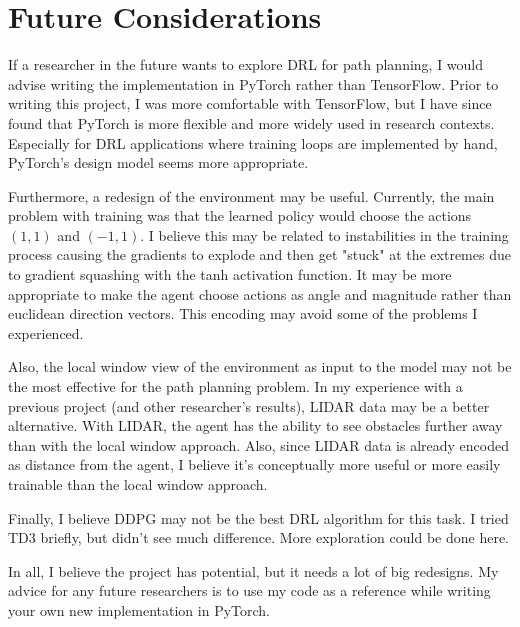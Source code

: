 \section{Future Considerations}
    If a researcher in the future wants to explore DRL for path planning, I would advise writing the implementation in PyTorch rather
    than TensorFlow. Prior to writing this project, I was more comfortable with TensorFlow, but I have since found that PyTorch is more
    flexible and more widely used in research contexts. Especially for DRL applications where training loops are implemented by hand,
    PyTorch's design model seems more appropriate.

    Furthermore, a redesign of the environment may be useful. Currently, the main problem with training was that the learned policy would
    choose the actions $(1, 1)$ and $(-1, 1)$. I believe this may be related to instabilities in the training process causing the gradients
    to explode and then get "stuck" at the extremes due to gradient squashing with the tanh activation function. It may be more appropriate
    to make the agent choose actions as angle and magnitude rather than euclidean direction vectors. This encoding may avoid some of the
    problems I experienced.
    
    Also, the local window view of the environment as input to the model may not be the most effective for the path planning
    problem. In my experience with a previous project (and other researcher's results), LIDAR data may be a better alternative.
    With LIDAR, the agent has the ability to see obstacles further away than with the local window approach. Also, since LIDAR data
    is already encoded as distance from the agent, I believe it's conceptually more useful or more easily trainable than the local
    window approach.

    Finally, I believe DDPG may not be the best DRL algorithm for this task. I tried TD3 briefly, but didn't see much difference. More exploration
    could be done here.

    In all, I believe the project has potential, but it needs a lot of big redesigns. My advice for any future researchers is to use my code
    as a reference while writing your own new implementation in PyTorch.